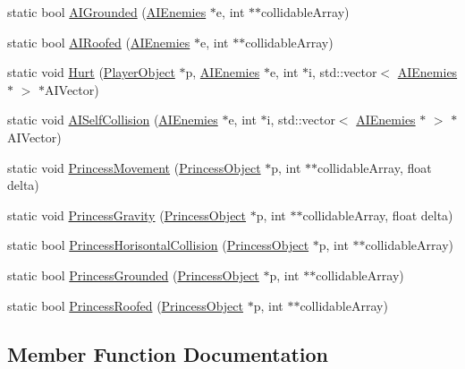 \begin{DoxyCompactItemize}
\item 
static bool \hyperlink{classPhysics_a4d4fa441923dfc16187236f9f9bb21e0}{A\+I\+Grounded} (\hyperlink{classAIEnemies}{A\+I\+Enemies} $\ast$e, int $\ast$$\ast$collidable\+Array)
\item 
static bool \hyperlink{classPhysics_a1f8a402c1f90ffcbf0f4109c95c28991}{A\+I\+Roofed} (\hyperlink{classAIEnemies}{A\+I\+Enemies} $\ast$e, int $\ast$$\ast$collidable\+Array)
\item 
static void \hyperlink{classPhysics_a7375c001f23111ea2291f8175c92f10d}{Hurt} (\hyperlink{classPlayerObject}{Player\+Object} $\ast$p, \hyperlink{classAIEnemies}{A\+I\+Enemies} $\ast$e, int $\ast$i, std\+::vector$<$ \hyperlink{classAIEnemies}{A\+I\+Enemies} $\ast$ $>$ $\ast$A\+I\+Vector)
\item 
static void \hyperlink{classPhysics_a573eb683739362d6808858497ce61397}{A\+I\+Self\+Collision} (\hyperlink{classAIEnemies}{A\+I\+Enemies} $\ast$e, int $\ast$i, std\+::vector$<$ \hyperlink{classAIEnemies}{A\+I\+Enemies} $\ast$ $>$ $\ast$A\+I\+Vector)
\item 
static void \hyperlink{classPhysics_a8942d4ff87203014fb0131be51c1e18e}{Princess\+Movement} (\hyperlink{classPrincessObject}{Princess\+Object} $\ast$p, int $\ast$$\ast$collidable\+Array, float delta)
\item 
static void \hyperlink{classPhysics_a42e304b0b1e3d83d84df7f9946efab83}{Princess\+Gravity} (\hyperlink{classPrincessObject}{Princess\+Object} $\ast$p, int $\ast$$\ast$collidable\+Array, float delta)
\item 
static bool \hyperlink{classPhysics_a3a91f17ca6e9d93c0cd4dcd1038fc26a}{Princess\+Horisontal\+Collision} (\hyperlink{classPrincessObject}{Princess\+Object} $\ast$p, int $\ast$$\ast$collidable\+Array)
\item 
static bool \hyperlink{classPhysics_a081cbec413244f80e8937da3ef751c70}{Princess\+Grounded} (\hyperlink{classPrincessObject}{Princess\+Object} $\ast$p, int $\ast$$\ast$collidable\+Array)
\item 
static bool \hyperlink{classPhysics_a57d1b73db188d1399f7a2c7b5ce1a865}{Princess\+Roofed} (\hyperlink{classPrincessObject}{Princess\+Object} $\ast$p, int $\ast$$\ast$collidable\+Array)
\end{DoxyCompactItemize}


\subsection{Member Function Documentation}
